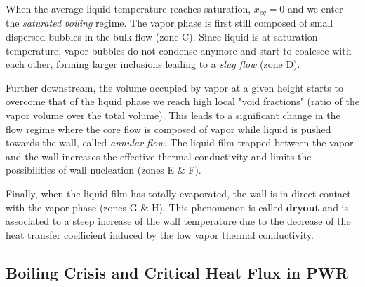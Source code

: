 \npar

When the average liquid temperature reaches saturation, $x_{eq} = 0 $ and we enter the \textit{saturated boiling} regime. The vapor phase is first still composed of small dispersed bubbles in the bulk flow (zone C). Since liquid is at saturation temperature, vapor bubbles do not condense anymore and start to coalesce with each other, forming larger inclusions leading to a \textit{slug flow} (zone D).

\npar

Further downstream, the volume occupied by vapor at a given height starts to overcome that of the liquid phase \ie we reach high local "void fractions" (ratio of the vapor volume over the total volume). This leads to a significant change in the flow regime where the core flow is composed of vapor while liquid is pushed towards the wall, called \textit{annular flow}.  The liquid film trapped between the vapor and the wall increases the effective thermal conductivity and limits the possibilities of wall nucleation (zones E \& F).




\npar

Finally, when the liquid film has totally evaporated, the wall is in direct contact with the vapor phase (zones G \& H). This phenomenon is called \textbf{dryout} and is associated to a steep increase of the wall temperature due to the decrease of the heat transfer coefficient induced by the low vapor thermal conductivity.%


\subsection{Boiling Crisis and Critical Heat Flux in PWR}


